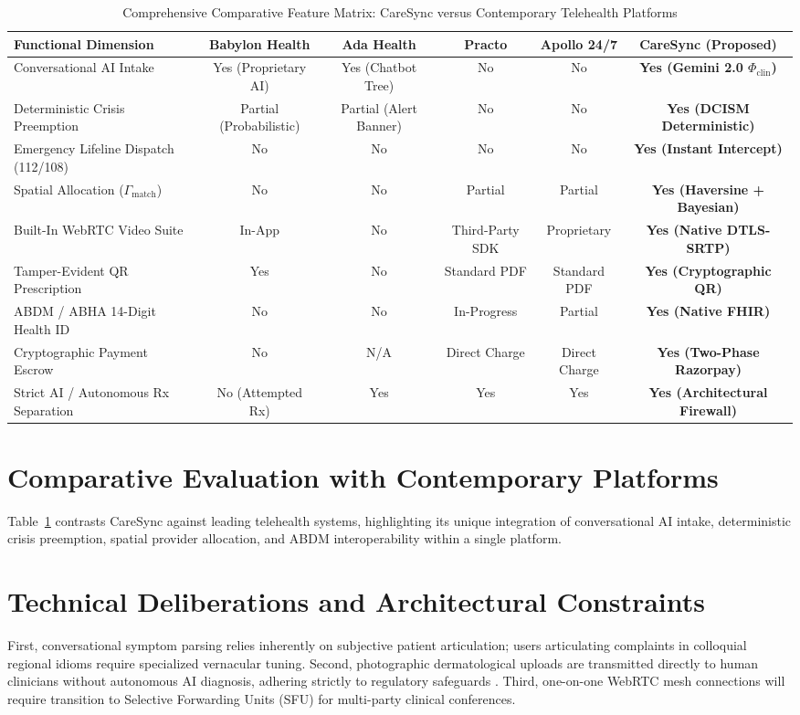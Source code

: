 \documentclass[conference]{IEEEtran}
\begin{document}
\begin{table}[t]
\caption{Comprehensive Comparative Feature Matrix: CareSync versus Contemporary Telehealth Platforms}
\label{tab:comp}
\centering
\begin{tabularx}{\textwidth}{lccccc}
\toprule
\textbf{Functional Dimension} & \textbf{Babylon Health \cite{jeindl2022}} & \textbf{Ada Health \cite{wallace2022}} & \textbf{Practo} & \textbf{Apollo 24/7} & \textbf{CareSync (Proposed)} \\
\midrule
Conversational AI Intake & Yes (Proprietary AI) & Yes (Chatbot Tree) & No & No & \textbf{Yes (Gemini 2.0 $\Phi_{\text{clin}}$)} \\
Deterministic Crisis Preemption & Partial (Probabilistic) & Partial (Alert Banner) & No & No & \textbf{Yes (DCISM Deterministic)} \\
Emergency Lifeline Dispatch (112/108) & No & No & No & No & \textbf{Yes (Instant Intercept)} \\
Spatial Allocation ($\Gamma_{\text{match}}$) & No & No & Partial & Partial & \textbf{Yes (Haversine + Bayesian)} \\
Built-In WebRTC Video Suite & In-App & No & Third-Party SDK & Proprietary & \textbf{Yes (Native DTLS-SRTP)} \\
Tamper-Evident QR Prescription & Yes & No & Standard PDF & Standard PDF & \textbf{Yes (Cryptographic QR)} \\
ABDM / ABHA 14-Digit Health ID & No & No & In-Progress & Partial & \textbf{Yes (Native FHIR)} \\
Cryptographic Payment Escrow & No & N/A & Direct Charge & Direct Charge & \textbf{Yes (Two-Phase Razorpay)} \\
Strict AI / Autonomous Rx Separation & No (Attempted Rx) & Yes & Yes & Yes & \textbf{Yes (Architectural Firewall)} \\
\bottomrule
\end{tabularx}
\end{table}

\section{Comparative Evaluation with Contemporary Platforms}
Table~\ref{tab:comp} contrasts CareSync against leading telehealth systems, highlighting its unique integration of conversational AI intake, deterministic crisis preemption, spatial provider allocation, and ABDM interoperability within a single platform.

\section{Technical Deliberations and Architectural Constraints}
First, conversational symptom parsing relies inherently on subjective patient articulation; users articulating complaints in colloquial regional idioms require specialized vernacular tuning. Second, photographic dermatological uploads are transmitted directly to human clinicians without autonomous AI diagnosis, adhering strictly to regulatory safeguards \cite{mohfw2020}. Third, one-on-one WebRTC mesh connections will require transition to Selective Forwarding Units (SFU) for multi-party clinical conferences.
\end{document}
